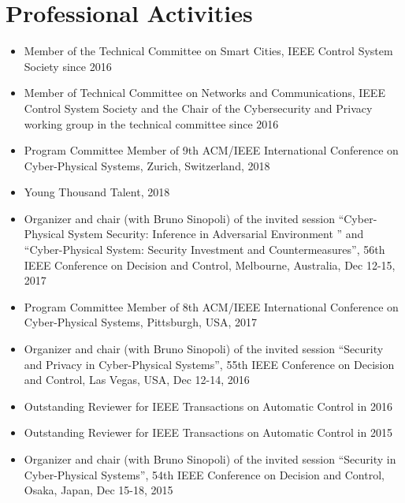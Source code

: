 \documentclass[10pt, a4paper]{article}
\begin{document}
\section*{Professional Activities}
\begin{itemize}
\item Member of the Technical Committee on Smart Cities, IEEE Control System Society since 2016\\

\item Member of Technical Committee on Networks and Communications, IEEE Control System Society and the Chair of the Cybersecurity and Privacy working group in the technical committee since 2016\\

\item Program Committee Member of 9th ACM/IEEE International Conference on Cyber-Physical Systems, Zurich, Switzerland, 2018\\

\item Young Thousand Talent, 2018

\item Organizer and chair (with Bruno Sinopoli) of the invited session “Cyber-Physical System Security: Inference in Adversarial Environment
” and “Cyber-Physical System: Security Investment and Countermeasures”, 56th IEEE Conference on Decision and Control, Melbourne, Australia, Dec 12-15, 2017\\

\item Program Committee Member of 8th ACM/IEEE International Conference on Cyber-Physical Systems, Pittsburgh, USA, 2017\\

\item Organizer and chair (with Bruno Sinopoli) of the invited session “Security and Privacy in Cyber-Physical Systems”, 55th IEEE Conference on Decision and Control, Las Vegas, USA, Dec 12-14, 2016\\

\item Outstanding Reviewer for IEEE Transactions on Automatic Control in 2016

\item Outstanding Reviewer for IEEE Transactions on Automatic Control in 2015

\item Organizer and chair (with Bruno Sinopoli) of the invited session “Security in Cyber-Physical Systems”, 54th IEEE Conference on Decision and Control, Osaka, Japan, Dec 15-18, 2015\\


\end{itemize}
\end{document}

